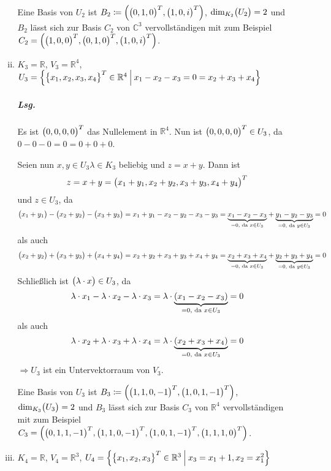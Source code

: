 \documentclass{scrreprt}
\begin{document}
\begin{enumerate}[(a)]
\begin{enumerate}[(i)]
    Eine Basis von $U_2$ ist
    $B_2 \coloneqq \qty(\qty\big(0, 1, 0)^T, \qty\big(1, 0, i)^T)$,
    $\text{dim}_{K_2}\qty\big(U_2) = 2$ und
    $B_2$ lässt sich zur Basis $C_2$ von $\mathbb{C}^3$ vervollständigen mit
    zum Beispiel
    $C_2 = \qty(\qty\big(1, 0, 0)^T, \qty\big(0, 1, 0)^T, \qty\big(1, 0, i)^T)$.

  \item $K_3 = \mathbb{R}$, $V_3 = \mathbb{R}^4$,
    $U_3 = \qty{\qty\big{x_1, x_2, x_3, x_4}^T \in \mathbb{R}^4 \:\middle|\: x_1 - x_2 - x_3 = 0 = x_2 + x_3 + x_4}$

    \subparagraph{Lsg.} Es ist $\qty\big(0, 0, 0, 0)^T$ das Nullelement in
    $\mathbb{R}^4$.
    Nun ist $\qty\big(0, 0, 0, 0)^T \in U_3$, da $0 - 0 - 0 = 0 = 0 + 0 + 0$.

    Seien nun $x, y \in U_3 \lambda \in K_3$ beliebig und $z = x + y$.
    Dann ist
    \[
      z = x + y = \qty\big(x_1 + y_1, x_2 + y_2, x_3 + y_3, x_4 + y_4)^T
    \]
    und $z \in U_3$, da
    \[
      \qty\big(x_1 + y_1) - \qty\big(x_2 + y_2) - \qty\big(x_3 + y_3)
      = x_1 + y_1 - x_2 - y_2 - x_3 - y_3
      = \underset{= 0\text{, da } x \in U_3}{\underbrace{x_1 - x_2 - x_3}} + \underset{= 0\text{, da } y \in U_3}{\underbrace{y_1 - y_2 - y_3}}
      = 0
    \]
    als auch
    \[
      \qty\big(x_2 + y_2) + \qty\big(x_3 + y_3) + \qty\big(x_4 + y_4)
      = x_2 + y_2 + x_3 + y_3 + x_4 + y_4
      = \underset{= 0\text{, da } x \in U_3}{\underbrace{x_2 + x_3 + x_4}} + \underset{= 0\text{, da } y \in U_3}{\underbrace{y_2 + y_3 + y_4}}
      = 0
    \]
    Schließlich ist $\qty\big(\lambda \cdot x) \in U_3$, da
    \[
      \lambda \cdot x_1 - \lambda \cdot x_2 - \lambda \cdot x_3 =
      \lambda \cdot \underset{= 0\text{, da } x \in U_3}{\underbrace{\qty(x_1 - x_2 - x_3)}}
      = 0
    \]
    als auch
    \[
      \lambda \cdot x_2 + \lambda \cdot x_3 + \lambda \cdot x_4 =
      \lambda \cdot \underset{= 0\text{, da } x \in U_3}{\underbrace{\qty(x_2 + x_3 + x_4)}}
      = 0
    \]
    $\Rightarrow U_3$ ist ein Untervektorraum von $V_3$.

    Eine Basis von $U_3$ ist
    $B_3 \coloneqq \qty(\qty\big(1, 1, 0, -1)^T, \qty\big(1, 0, 1, -1)^T)$,
    $\text{dim}_{K_3}\qty\big(U_3) = 2$ und
    $B_3$ lässt sich zur Basis $C_3$ von $\mathbb{R}^4$ vervollständigen mit
    zum Beispiel
    $C_3 = \qty(\qty\big(0, 1, 1, -1)^T, \qty\big(1, 1, 0, -1)^T, \qty\big(1, 0, 1, -1)^T, \qty\big(1, 1, 1, 0)^T)$.

  \item $K_4 = \mathbb{R}$, $V_4 = \mathbb{R}^3$,
    $U_4 = \qty{\qty\big{x_1, x_2, x_3}^T \in \mathbb{R}^3 \:\middle|\: x_3 = x_1 + 1, x_2 = x_1^2}$


\end{enumerate}
\end{enumerate}
\end{document}
